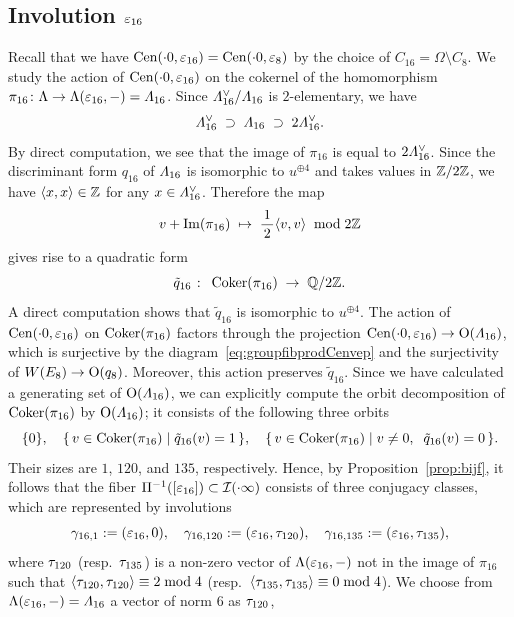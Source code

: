 \documentclass{amsart} %
\begin{document}
\subsection{Involution $\varepsilon_{16}$}\label{subsec:vep16}
%
Recall that we have $\mathrm{Cen}(\cdot 0, \varepsilon_{16})=\mathrm{Cen}(\cdot 0, \varepsilon_{8})$
by the choice of $C_{16}=\Omega\setminus C_8$.
We study the action of 
$\mathrm{Cen}(\cdot 0, \varepsilon_{16})$
on the cokernel of the homomorphism 
$\pi_{16}\colon \Lambda \to \Lambda(\varepsilon_{16}, -)=\varLambda_{16}$.
Since $\varLambda_{16}^{\vee}/\varLambda_{16}$ 
is $2$-elementary,
we have
%
\begin{equation} \label{eq:filteration}
\varLambda_{16}^{\vee} \;\supset\; \varLambda_{16}\; \supset \; 2\varLambda_{16}^{\vee}.
\end{equation}
%
By direct computation,  we see  that 
the image  of $\pi_{16}$ is equal to $2\varLambda_{16}^{\vee}$.
Since the discriminant form $q_{16}$ of $\varLambda_{16}$ 
is isomorphic to $u^{\oplus 4}$ and takes values in $\mathord{\mathbb{Z}}/2\mathord{\mathbb{Z}}$,
we have $\langle x, x \rangle\in \mathord{\mathbb{Z}}$ for any $x\in \varLambda_{16}^{\vee}$.
Therefore the map
\[
v+\operatorname{Im} (\pi_{16}) \;\mapsto\; \frac{\,1\,}{2} \langle v, v \rangle \;\bmod 2\mathord{\mathbb{Z}}
\]
gives rise to a quadratic form 
\[
\tilde{q}_{16}\;\colon\; \operatorname{Coker} (\pi_{16})\;\to\; \mathord{\mathbb{Q}}/2\mathord{\mathbb{Z}}.
 \]
A direct computation shows that $\tilde{q}_{16}$ is isomorphic to $u^{\oplus 4}$.
The action of $\mathrm{Cen}(\cdot 0, \varepsilon_{16})$ on $\operatorname{Coker} (\pi_{16})$ 
factors through the projection
$\mathrm{Cen}(\cdot 0, \varepsilon_{16})\to \mathord{\mathrm{O}}(\varLambda_{16})$,
which is surjective
by the diagram~\eqref{eq:groupfibprodCenvep} and the surjectivity of %
$W(E_8)\to \mathord{\mathrm{O}}(q_8)$. 
Moreover, this action 
preserves $\tilde{q}_{16}$.
Since we have calculated a generating set of $\mathord{\mathrm{O}}(\varLambda_{16})$,
we can explicitly compute the orbit decomposition of $\operatorname{Coker} (\pi_{16})$
by $\mathord{\mathrm{O}}(\varLambda_{16})$; it consists of the following three orbits 
\[
\{0\},\quad 
\{\,{v \in\operatorname{Coker} (\pi_{16}) }\mid {\tilde{q}_{16}(v)=1} \,\},
\quad
\{\,{v \in\operatorname{Coker} (\pi_{16}) }\mid {v\ne 0, \;\; \tilde{q}_{16}(v)=0} \,\}.
\]
Their sizes are $1$, $120$, and $135$, respectively.
Hence, by Proposition~\ref{prop:bijf}, 
 it follows that the fiber $\Pi^{-1} ([\varepsilon_{16}])\subset \mathord{\mathcal{I}}(\cdot \infty)$ consists of three conjugacy classes,
 which are 
 represented by involutions
 \[
 \gamma_{16, 1}:=(\varepsilon_{16}, 0),
 \quad
 \gamma_{16, 120}:=(\varepsilon_{16},\tau_{120}),
 \quad
 \gamma_{16, 135}:=(\varepsilon_{16},\tau_{135}),
 \]
where $\tau_{120}$ (resp.~$ \tau_{135}$) is a non-zero vector of $\Lambda(\varepsilon_{16}, -)$ 
not in the image of $\pi_{16}$ 
such that
$\langle \tau_{120},\tau_{120} \rangle\equiv 2 \bmod 4$
 (resp.~$\langle \tau_{135},\tau_{135} \rangle\equiv 0 \bmod 4$).
 We choose from $\Lambda(\varepsilon_{16}, -)=\varLambda_{16}$ a vector of norm $6$ as $ \tau_{120}$,
\end{document}
